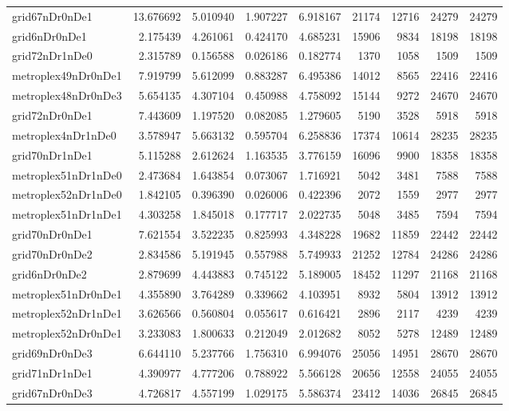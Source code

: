 \begin{longtable}{|l|r|r|r|r|r|r|r|r|}
grid67nDr0nDe1 & 13.676692 & 5.010940 & 1.907227 & 6.918167 & 21174 & 12716 & 24279 & 24279 \\
grid6nDr0nDe1 & 2.175439 & 4.261061 & 0.424170 & 4.685231 & 15906 & 9834 & 18198 & 18198 \\
grid72nDr1nDe0 & 2.315789 & 0.156588 & 0.026186 & 0.182774 & 1370 & 1058 & 1509 & 1509 \\
metroplex49nDr0nDe1 & 7.919799 & 5.612099 & 0.883287 & 6.495386 & 14012 & 8565 & 22416 & 22416 \\
metroplex48nDr0nDe3 & 5.654135 & 4.307104 & 0.450988 & 4.758092 & 15144 & 9272 & 24670 & 24670 \\
grid72nDr0nDe1 & 7.443609 & 1.197520 & 0.082085 & 1.279605 & 5190 & 3528 & 5918 & 5918 \\
metroplex4nDr1nDe0 & 3.578947 & 5.663132 & 0.595704 & 6.258836 & 17374 & 10614 & 28235 & 28235 \\
grid70nDr1nDe1 & 5.115288 & 2.612624 & 1.163535 & 3.776159 & 16096 & 9900 & 18358 & 18358 \\
metroplex51nDr1nDe0 & 2.473684 & 1.643854 & 0.073067 & 1.716921 & 5042 & 3481 & 7588 & 7588 \\
metroplex52nDr1nDe0 & 1.842105 & 0.396390 & 0.026006 & 0.422396 & 2072 & 1559 & 2977 & 2977 \\
metroplex51nDr1nDe1 & 4.303258 & 1.845018 & 0.177717 & 2.022735 & 5048 & 3485 & 7594 & 7594 \\
grid70nDr0nDe1 & 7.621554 & 3.522235 & 0.825993 & 4.348228 & 19682 & 11859 & 22442 & 22442 \\
grid70nDr0nDe2 & 2.834586 & 5.191945 & 0.557988 & 5.749933 & 21252 & 12784 & 24286 & 24286 \\
grid6nDr0nDe2 & 2.879699 & 4.443883 & 0.745122 & 5.189005 & 18452 & 11297 & 21168 & 21168 \\
metroplex51nDr0nDe1 & 4.355890 & 3.764289 & 0.339662 & 4.103951 & 8932 & 5804 & 13912 & 13912 \\
metroplex52nDr1nDe1 & 3.626566 & 0.560804 & 0.055617 & 0.616421 & 2896 & 2117 & 4239 & 4239 \\
metroplex52nDr0nDe1 & 3.233083 & 1.800633 & 0.212049 & 2.012682 & 8052 & 5278 & 12489 & 12489 \\
grid69nDr0nDe3 & 6.644110 & 5.237766 & 1.756310 & 6.994076 & 25056 & 14951 & 28670 & 28670 \\
grid71nDr1nDe1 & 4.390977 & 4.777206 & 0.788922 & 5.566128 & 20656 & 12558 & 24055 & 24055 \\
grid67nDr0nDe3 & 4.726817 & 4.557199 & 1.029175 & 5.586374 & 23412 & 14036 & 26845 & 26845 \\

\end{longtable}
